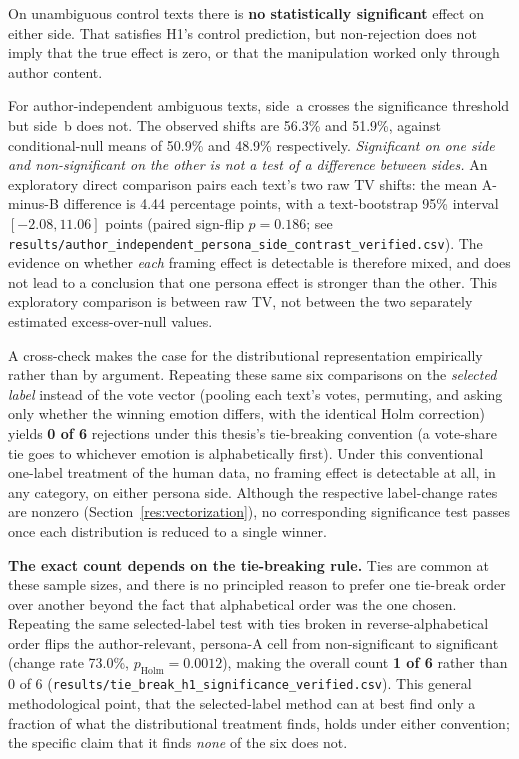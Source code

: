On unambiguous control texts there is \textbf{no statistically significant} effect on either
side. That satisfies H1's control prediction, but non-rejection does not imply that the true
effect is zero, or that the manipulation worked only through author content.

For author-independent ambiguous texts, side~a crosses the significance threshold but side~b does
not. The observed shifts are 56.3\% and 51.9\%, against conditional-null means of 50.9\% and
48.9\% respectively. \emph{Significant on one side and non-significant on the other is not a test
of a difference between sides.} An exploratory direct comparison pairs each text's two raw TV
shifts: the mean A-minus-B difference is 4.44 percentage points, with a text-bootstrap
95\% interval $[-2.08, 11.06]$ points (paired sign-flip $p=0.186$; see
\texttt{results/\allowbreak author\_\allowbreak independent\_\allowbreak persona\_\allowbreak side\_\allowbreak contrast\_\allowbreak verified.csv}). The evidence on
whether \emph{each} framing effect is detectable is therefore mixed, and does not lead to a
conclusion that one persona effect is stronger than the other. This exploratory comparison is
between raw TV, not between the two separately estimated excess-over-null values.

\noindent
A cross-check makes the case for the distributional representation empirically rather than by
argument. Repeating these same six comparisons on the \emph{selected label} instead of the vote
vector (pooling each text's votes, permuting, and asking only whether the winning emotion
differs, with the identical Holm correction) yields \textbf{0 of 6} rejections under this
thesis's tie-breaking convention (a vote-share tie goes to whichever emotion is alphabetically
first). Under this conventional one-label treatment of the human data, no framing effect is
detectable at all, in any category, on either persona side. Although the respective label-change
rates are nonzero (Section~\ref{res:vectorization}), no corresponding significance test passes
once each distribution is reduced to a single winner.

\textbf{The exact count depends on the tie-breaking rule.} Ties are common at these
sample sizes, and there is no principled reason to prefer one tie-break order over another beyond
the fact that alphabetical order was the one chosen. Repeating the same selected-label test
with ties broken in reverse-alphabetical order flips the author-relevant, persona-A cell
from non-significant to significant (change rate 73.0\%, $p_{\text{Holm}} = 0.0012$), making the
overall count \textbf{1 of 6} rather than 0 of 6
(\texttt{results/\allowbreak tie\_\allowbreak break\_\allowbreak h1\_\allowbreak significance\_\allowbreak verified.csv}). This general methodological point,
that the selected-label method can at best find only a fraction of what the distributional
treatment finds, holds under either convention; the specific claim that it finds \emph{none} of
the six does not.

